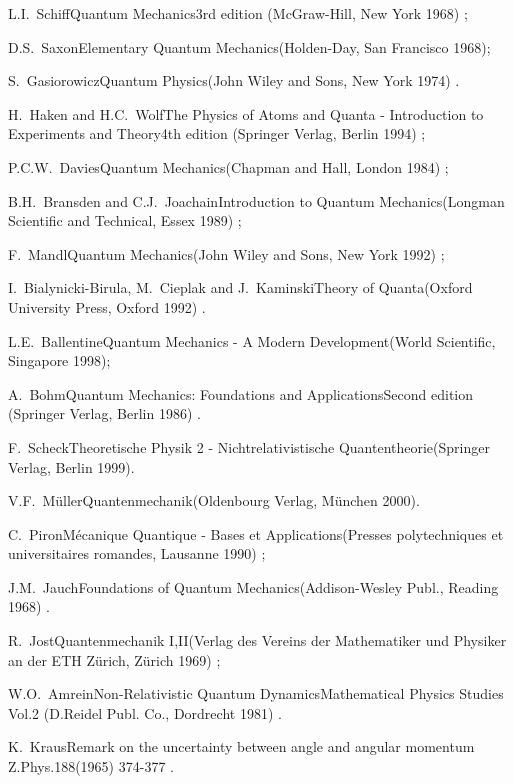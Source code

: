 \documentclass[12pt]{report}
\begin{document}
\begin{thebibliography}{22}
\bookref
{L.I.~Schiff}{Quantum Mechanics}{3rd edition
(McGraw-Hill, New York 1968) ;}
 
\bookref
{D.S.~Saxon}{Elementary Quantum Mechanics}{(Holden-Day, San Francisco
1968);}
 
\bookref
{S.~Gasiorowicz}{Quantum Physics}{(John Wiley and Sons, New York
1974) .}

 
\bookref
{H.~Haken and H.C.~Wolf}{The Physics of Atoms and Quanta - Introduction
to Experiments and Theory}{4th edition
(Springer Verlag, Berlin 1994) ;}
 
\bookref
{P.C.W.~Davies}{Quantum Mechanics}{(Chapman and Hall, London 1984) ;}
 
\bookref
{B.H.~Bransden and C.J.~Joachain}{Introduction to Quantum
Mechanics}{(Longman Scientific and Technical, Essex 1989) ;}
 
\bookref
{F.~Mandl}{Quantum Mechanics}{(John Wiley and Sons, New York 1992) ;}
  
\bookref
{I.~Bialynicki-Birula, M.~Cieplak and J.~Kaminski}{Theory of Quanta}{(Oxford 
University Press, Oxford 1992) .}


\bookref
{L.E.~Ballentine}{Quantum Mechanics - A Modern Development}{(World
Scientific, Singapore 1998);}
 
\bookref
{A.~Bohm}{Quantum Mechanics: Foundations and Applications}{Second
edition (Springer Verlag, Berlin 1986) .}


\bookref
{F.~Scheck}{Theoretische Physik 2 - Nichtrelativistische 
Quantentheorie}{(Springer Verlag, 
Berlin  1999).}


\bookref
{V.F.~M\"uller}{Quantenmechanik}{(Oldenbourg Verlag, 
M\"unchen 2000).}

 
\bookref
{C.~Piron}{M\'ecanique Quantique - Bases et Applications}{(Presses
polytechniques et universitaires romandes, Lausanne 1990) ;}
 
\bookref
{J.M.~Jauch}{Foundations of Quantum Mechanics}{(Addison-Wesley Publ.,
Reading 1968) .}

 
\bookref
{R.~Jost}{Quantenmechanik I,II}{(Verlag des Vereins der Mathematiker
und Physiker an der ETH Z\"urich, Z\"urich 1969) ;}
 
\bookref
{W.O.~Amrein}{Non-Relativistic Quantum Dynamics}{Mathematical
Physics Studies Vol.2 (D.Reidel Publ. Co., Dordrecht 1981) .}


\artref
{K.~Kraus}{Remark on the uncertainty between angle and angular momentum}{
Z.Phys.}{188}{(1965) 374-377 .}



\end{thebibliography}
\end{document}
